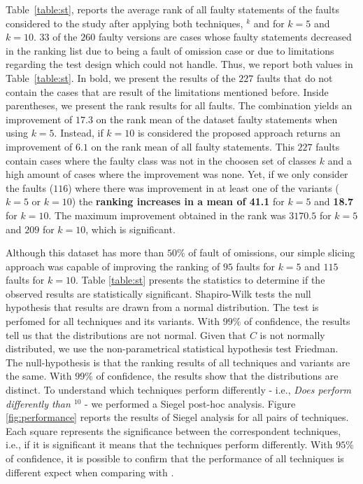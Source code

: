 \documentclass{article}
\begin{document}
Table~\ref{table:st}, reports the average rank of all faulty
statements of the \dfj{} faults considered to the study after applying both
techniques, \sfl{}$^{k}$ and  for $k=5$ and $k=10$. $33$ of the $260$
faulty versions are cases whose faulty statements decreased in the ranking list due to being a fault of omission case or due to limitations regarding the test design which \ds{} could not handle. Thus, we report both values in Table~\ref{table:st}. In bold, we present the
results of the $227$ faults that do not contain the cases that are result of the limitations mentioned before. Inside parentheses, we present the
rank results for all faults. The  combination yields an improvement
of $17.3$ on the rank mean of the dataset faulty statements when using $k=5$.
Instead, if $k=10$ is considered the proposed approach returns an improvement of
$6.1$ on the rank mean of all faulty statements.
This $227$ faults contain cases where the faulty class was not in the choosen set of classes $k$ and a high amount of cases where the improvement was none. Yet,
if we only consider the faults ($116$) where there was improvement in at least
one of the variants ($k=5$ or $k=10$) the \textbf{ranking increases in a mean of 41.1} for
$k=5$ and \textbf{18.7} for $k=10$. The maximum improvement obtained in the \sfl{} rank was  $3170.5$ for $k=5$ and $209$ for $k=10$, which is significant.


Although this dataset has more than $50\%$ of fault of omissions,
our simple slicing approach was capable of improving the ranking of $95$ faults for
$k=5$ and $115$ faults for $k=10$. Table \ref{table:st} presents the statistics
to determine if the observed results are statistically significant. Shapiro-Wilk
tests the null hypothesis that results are drawn from a normal distribution. The
test is perfomed for all techniques and its variants. With $99\%$ of confidence,
the results tell us that the distributions are not normal. Given that $C$ is not
normally distributed, we use the non-parametrical statistical hypothesis test
Friedman. The null-hypothesis is that the ranking results of all techniques and
variants are the same. With $99\%$ of confidence, the results show that the
distributions are distinct. To understand which techniques perform differently 
- i.e., \textit{Does  perform differently than \sfl{}$^{10}$} -
we performed a Siegel post-hoc analysis. Figure
\ref{fig:performance} reports the results of Siegel analysis for all pairs of techniques. Each square represents the significance between the correspondent techniques, i.e., if it is significant it means that the techniques perform differently. With $95\%$ of confidence, it is possible to confirm that the performance of all techniques is different expect when comparing  with .
\end{document}

